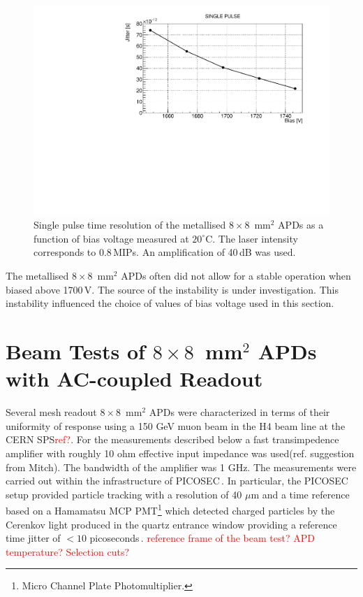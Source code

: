\documentclass{article}
\begin{document}
\begin{figure}
  \centering
  \includegraphics[width = 0.6 \textwidth]{timeRes8x8metal}
  \caption{Single pulse time resolution of the metallised $8 \times 8$~mm$^2$ APDs as a function of bias voltage measured at $20^\circ$C. The laser intensity corresponds to 0.8\,MIPs. An amplification of 40\,dB was used.}
  \label{fig:timeRes8x8metal}
\end{figure}

The metallised $8 \times 8$~mm$^2$ APDs often did not allow for a stable operation when biased above 1700\,V.
The source of the instability is under investigation.
This instability influenced the choice of values of bias voltage used in this section.

\section{Beam Tests of $8 \times 8$~mm$^2$ APDs with AC-coupled Readout}
\label{sec:tb8x8}

Several mesh readout $8 \times 8$~mm$^2$ APDs were characterized in terms of their uniformity of response using a 150 GeV muon beam in the H4 beam line at the CERN SPS\textcolor{red}{ref?}.
For the measurements described below a fast transimpedence amplifier with roughly 10 ohm effective input impedance was used(ref. suggestion from Mitch).
The bandwidth of the amplifier was 1 GHz.
The measurements were carried out within the infrastructure of PICOSEC\,\cite{bortfeld2018}.
In particular, the PICOSEC setup provided particle tracking with a resolution of 40 $\mu$m and a time reference based on a Hamamatsu MCP PMT\footnote{Micro Channel Plate Photomultiplier.} which detected charged particles by the Cerenkov light produced in the quartz entrance window providing a reference time jitter of $<10$ picoseconds\,\cite{sohl2018}.
\textcolor{red}{reference frame of the beam test? APD temperature?  Selection cuts?}
\end{document}
